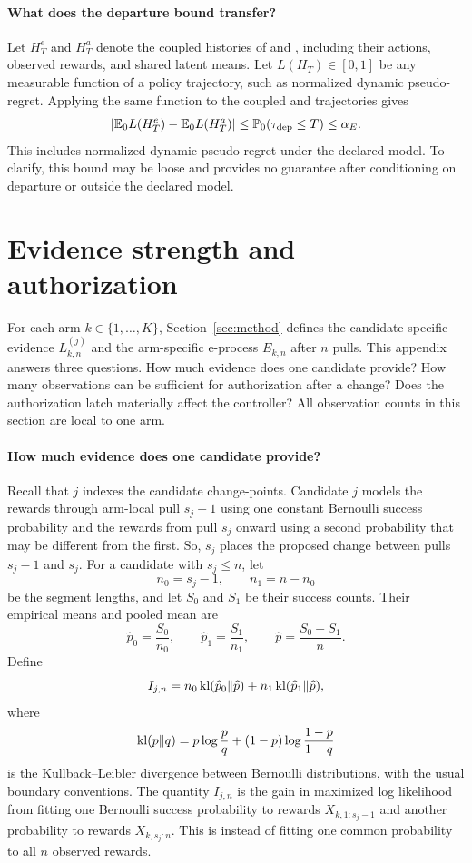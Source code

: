 \paragraph{What does the departure bound transfer?}
Let $H_T^e$ and $H_T^a$ denote the coupled histories of \method{} and
\anchor{}, including their actions, observed rewards, and shared latent means.
Let $L(H_T)\in[0,1]$ be any measurable function of a policy trajectory,
such as normalized dynamic pseudo-regret.
Applying the same function to the coupled \method{} and \anchor{} trajectories
gives
\[
\left|\mathbb E_0 L(H_T^e)-\mathbb E_0 L(H_T^a)\right|
\leq\mathbb P_0(\tau_{\mathrm{dep}}\leq T)\leq\alpha_E.
\]
This includes normalized dynamic pseudo-regret under the declared model.
To clarify, this bound may be loose and provides no guarantee after
conditioning on departure or outside the declared model.

\section{Evidence strength and authorization}
\label{app:evidence}

For each arm $k\in\{1,\ldots,K\}$, Section~\ref{sec:method} defines the
candidate-specific evidence $L_{k,n}^{(j)}$ and the arm-specific e-process
$E_{k,n}$ after $n$ pulls.
This appendix answers three questions.
How much evidence does one candidate provide?
How many observations can be sufficient for authorization after a change?
Does the authorization latch materially affect the controller?
All observation counts in this section are local to one arm.

\paragraph{How much evidence does one candidate provide?}
Recall that $j$ indexes the candidate change-points.
Candidate $j$ models the rewards through arm-local pull $s_j-1$ using one constant Bernoulli success
probability and the rewards from pull $s_j$ onward using a second probability that may be different from the first.
So, $s_j$ places the proposed change between pulls $s_j-1$ and $s_j$.
For a candidate with $s_j\leq n$, let
\[
 n_0=s_j-1,
 \qquad
 n_1=n-n_0
\]
be the segment lengths, and let $S_0$ and $S_1$ be their success counts.
Their empirical means and pooled mean are
\[
 \widehat p_0=\frac{S_0}{n_0},
 \qquad
 \widehat p_1=\frac{S_1}{n_1},
 \qquad
 \widehat p=\frac{S_0+S_1}{n}.
\]
Define
\[
 I_{j,n}
 =
 n_0\operatorname{kl}(\widehat p_0\Vert\widehat p)
 +
 n_1\operatorname{kl}(\widehat p_1\Vert\widehat p),
\]
where
\[
 \operatorname{kl}(p\Vert q)
 =
 p\log\frac pq
 +(1-p)\log\frac{1-p}{1-q}
\]
is the Kullback--Leibler divergence between Bernoulli distributions, with the
usual boundary conventions.
The quantity $I_{j,n}$ is the gain in maximized log likelihood from fitting one Bernoulli success probability to rewards
$X_{k,1:s_j-1}$ and another probability to rewards $X_{k,s_j:n}$.
This is instead of fitting one common probability to all $n$ observed rewards.

